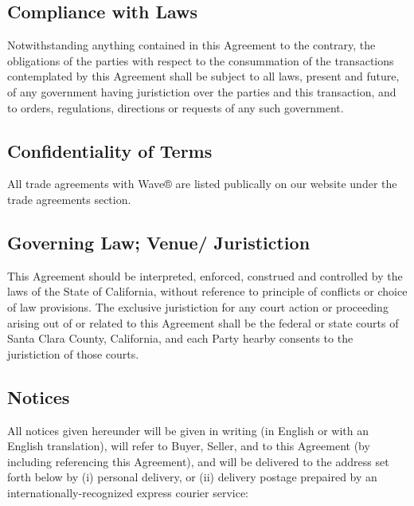 \documentclass[letterpaper,10pt,english]{sphinxmanual}
\begin{document}
\subsection{Compliance with Laws}
\label{\detokenize{7-miscellaneous:compliance-with-laws}}
Notwithstanding anything contained in this Agreement to the contrary, the obligations of the parties with respect to the consummation of the transactions contemplated by this Agreement shall be subject to all laws, present and future, of any government having juristiction over the parties and this transaction, and to orders, regulations, directions or requests of any such government.


\subsection{Confidentiality of Terms}
\label{\detokenize{7-miscellaneous:confidentiality-of-terms}}
All trade agreements with Wave® are listed publically on our website  under the trade agreements section.


\subsection{Governing Law; Venue/ Juristiction}
\label{\detokenize{7-miscellaneous:governing-law-venue-juristiction}}
This Agreement should be interpreted, enforced, construed and controlled by the laws of the State of California, without reference to principle of conflicts or choice of law provisions. The exclusive juristiction for any court action or proceeding arising out of or related to this Agreement shall be the federal or state courts of Santa Clara County, California, and each Party hearby consents to the juristiction of those courts.


\subsection{Notices}
\label{\detokenize{7-miscellaneous:notices}}
All notices given hereunder will be given in writing (in English or with an English translation), will refer to Buyer, Seller, and to this Agreement (by including referencing this Agreement), and will be delivered to the address set forth below by (i) personal delivery, or (ii) delivery postage prepaired by an internationally-recognized express courier service:
\end{document}
